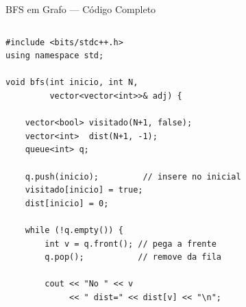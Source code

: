 \documentclass[aspectratio=169,10pt]{beamer}
\begin{document}
\begin{frame}[fragile,shrink=5]{BFS em Grafo --- Código Completo}
  \begin{columns}[t]
      \begin{tcolorbox}[caixaCodigo]
        \begin{lstlisting}[style=cppsmall]
#include <bits/stdc++.h>
using namespace std;

void bfs(int inicio, int N,
         vector<vector<int>>& adj) {

    vector<bool> visitado(N+1, false);
    vector<int>  dist(N+1, -1);
    queue<int> q;

    q.push(inicio);         // insere no inicial
    visitado[inicio] = true;
    dist[inicio] = 0;

    while (!q.empty()) {
        int v = q.front(); // pega a frente
        q.pop();           // remove da fila

        cout << "No " << v
             << " dist=" << dist[v] << "\n";


\end{lstlisting}
\end{tcolorbox}
\end{columns}
\end{frame}
\end{document}
